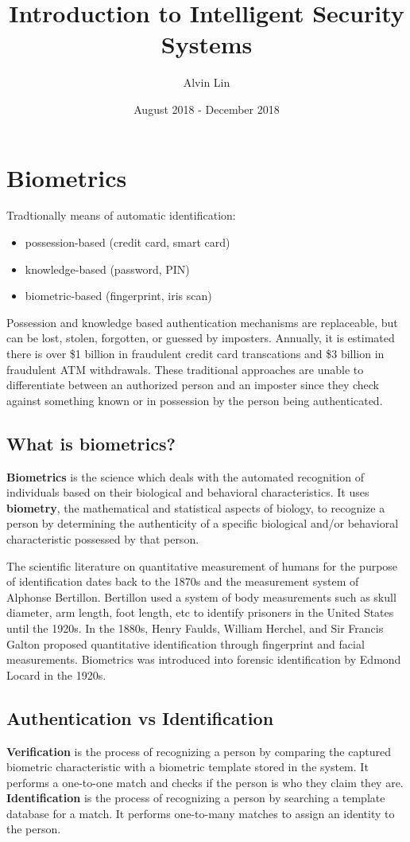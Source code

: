 \documentclass{math}
\title{Introduction to Intelligent Security Systems}
\author{Alvin Lin}
\date{August 2018 - December 2018}
\begin{document}
\maketitle

\section*{Biometrics}
Tradtionally means of automatic identification:
\begin{itemize}
  \item possession-based (credit card, smart card)
  \item knowledge-based (password, PIN)
  \item biometric-based (fingerprint, iris scan)
\end{itemize}
Possession and knowledge based authentication mechanisms are replaceable, but
can be lost, stolen, forgotten, or guessed by imposters. Annually, it is
estimated there is over \$1 billion in fraudulent credit card transcations and
\$3 billion in fraudulent ATM withdrawals. These traditional approaches are
unable to differentiate between an authorized person and an imposter since they
check against something known or in possession by the person being
authenticated.

\subsection*{What is biometrics?}
\textbf{Biometrics} is the science which deals with the automated recognition of
individuals based on their biological and behavioral characteristics. It
uses \textbf{biometry}, the mathematical and statistical aspects of biology,
to recognize a person by determining the authenticity of a specific biological
and/or behavioral characteristic possessed by that person. \par
The scientific literature on quantitative measurement of humans for the purpose
of identification dates back to the 1870s and the measurement system of Alphonse
Bertillon. Bertillon used a system of body measurements such as skull diameter,
arm length, foot length, etc to identify prisoners in the United States until
the 1920s. In the 1880s, Henry Faulds, William Herchel, and Sir Francis Galton
proposed quantitative identification through fingerprint and facial
measurements. Biometrics was introduced into forensic identification by
Edmond Locard in the 1920s.

\subsection*{Authentication vs Identification}
\textbf{Verification} is the process of recognizing a person by comparing the
captured biometric characteristic with a biometric template stored in the
system. It performs a one-to-one match and checks if the person is who they
claim they are. \\
\textbf{Identification} is the process of recognizing a person by searching a
template database for a match. It performs one-to-many matches to assign an
identity to the person.
\end{document}
